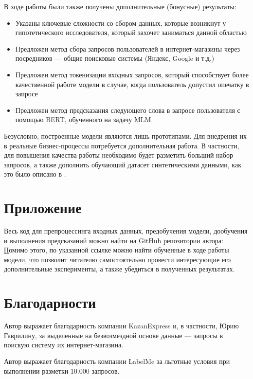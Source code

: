\documentclass[12pt,a4paper]{article}
\begin{document}
\noindent В ходе работы были также получены дополнительные (бонусные) результаты:
\begin{itemize}
    \item Указаны ключевые сложности со сбором данных, которые возникнут у гипотетического исследователя, который захочет заниматься данной областью 
    \item Предложен метод сбора запросов пользователей в интернет-магазины через посредников --- общие поисковые системы (Яндекс, Google и т.д.)
    \item Предложен метод токенизации входных запросов, который способствует более качественной работе модели в случае, когда пользователь допустил опечатку в запросе
    \item Предложен метод предсказания следующего слова в запросе пользователя с помощью BERT, обученного на задачу MLM
\end{itemize}

Безусловно, построенные модели являются лишь прототипами. Для внедрения их в реальные бизнес-процессы потребуется дополнительная работа. В частности, для повышения качества работы необходимо будет разметить больший набор запросов, а также дополнить обучающий датасет синтетическими данными, как это было описано в \cite{ner}.

\section{Приложение}

Весь код для препроцессинга входных данных, предобучения модели, дообучения и выполнения предсказаний можно найти на GitHub репозитории автора: \href{https://github.com/Sorrow321/cmc\_seminar/}

Помимо этого, по указанной ссылке можно найти обученные в ходе работы модели, что позволит читателю самостоятельно провести интересующие его дополнительные эксперименты, а также убедиться в полученных результатах.

\section{Благодарности}
Автор выражает благодарность компании KazanExpress и, в частности, Юрию Гаврилину, за выделенные на безвозмездной основе данные --- запросы в поискую систему их интернет-магазина. 

Автор выражает благодарность компании LabelMe за льготные условия при выполнении разметки 10.000 запросов.

 

\end{document}
